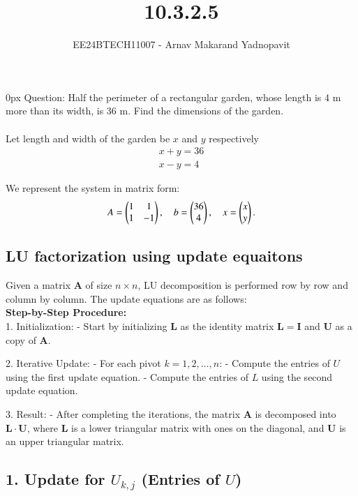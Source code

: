 \documentclass[journal,12pt,onecolumn]{IEEEtran}
\theoremstyle{remark}
\begin{document}
\title{10.3.2.5}
\author{EE24BTECH11007 - Arnav Makarand Yadnopavit}
\maketitle
\renewcommand{\thefigure}{\theenumi}
\renewcommand{\thetable}{\theenumi}
\parindent 0px Question: Half the perimeter of a rectangular garden, whose length is 4 m more than its width, is
36 m. Find the dimensions of the garden.\\
\solution\\
Let length and width of the garden be $x$ and $y$ respectively 
\begin{align}
    x+y=36\\
    x-y=4
\end{align}

We represent the system in matrix form:
\begin{align}
A = \begin{pmatrix}1 & 1 \\ 1 & -1\end{pmatrix}, \quad
b = \begin{pmatrix}36 \\ 4\end{pmatrix}, \quad
x = \begin{pmatrix}x \\ y\end{pmatrix}.
\end{align}

\subsection*{LU factorization using update equaitons}
    Given a matrix $ \mathbf{A} $ of size $ n \times n $, LU decomposition is performed row by row and column by column. The update equations are as follows:\\
    \textbf{Step-by-Step Procedure:}\\
1. Initialization: 
   - Start by initializing $ \mathbf{L} $ as the identity matrix $ \mathbf{L} = \mathbf{I} $ and $ \mathbf{U} $ as a copy of $ \mathbf{A} $.
   
2. Iterative Update:
   - For each pivot $ k = 1, 2, \ldots, n $:
     - Compute the entries of $ U $ using the first update equation.
     - Compute the entries of $ L $ using the second update equation.
   
3. Result:
   - After completing the iterations, the matrix $ \mathbf{A} $ is decomposed into $ \mathbf{L} \cdot \mathbf{U} $, where $ \mathbf{L} $ is a lower triangular matrix with ones on the diagonal, and $ \mathbf{U} $ is an upper triangular matrix.

    

\subsection*{1. Update for $ U_{k,j} $ (Entries of $ U $)}
\end{document}
